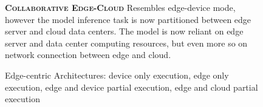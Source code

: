 \begin{figure}
\begin{minipage}{0.3\linewidth}
\begin{figure}
		\end{figure}
	\end{minipage}
	\begin{minipage}{0.5\linewidth}
		\centering
		\captionsetup[subfigure]{justification=centering}
		\begin{figure}
			\centering
		\end{figure}
	\end{minipage}
	\hfill
	\begin{minipage}{0.45\linewidth}
		\textbf{\protect{} \textsc{Collaborative Edge-Cloud}}
		\color{caption-color} \newline
		Resembles edge-device mode, however the model inference task is now partitioned between edge server and cloud data centers. The model is now reliant on edge server and data center computing resources, but even more so on network connection between edge and cloud.
	\end{minipage}
	\caption[Edge-centric Architectures]{Edge-centric Architectures: \protect{} device only execution, \protect{} edge only execution,\protect{} edge and device partial execution, \protect{} edge and cloud partial execution}
	\label{fig:edge_arch}
\end{figure}


